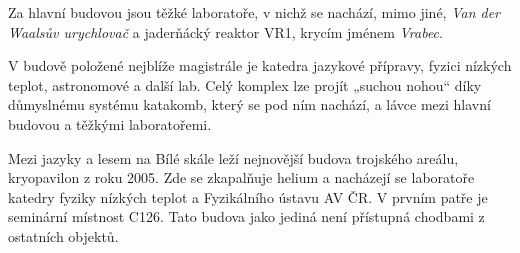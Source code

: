 Za hlavní budovou jsou těžké laboratoře, v nichž se nachází, mimo jiné, \textit{Van der Waalsův urychlovač} a jaderňácký reaktor
VR1, krycím jménem \textit{Vrabec}.

V budově položené nejblíže magistrále je katedra jazykové přípravy, fyzici nízkých teplot, astronomové a další lab. Celý
komplex lze projít „suchou nohou“ díky důmyslnému systému katakomb, který se pod ním nachází, a lávce mezi hlavní
budovou a těžkými laboratořemi.

Mezi jazyky a lesem na Bílé skále leží nejnovější budova trojského areálu, kryopavilon z roku 2005. Zde se zkapalňuje
helium a nacházejí se laboratoře katedry fyziky nízkých teplot a Fyzikálního ústavu AV ČR. V prvním patře je seminární
místnost C126. Tato budova jako jediná není přístupná chodbami z ostatních objektů.
